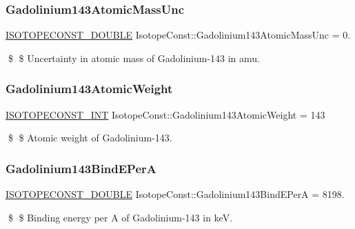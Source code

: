 \subsubsection{\texorpdfstring{Gadolinium143\+Atomic\+Mass\+Unc}{Gadolinium143AtomicMassUnc}}
{\footnotesize\ttfamily \mbox{\hyperlink{group___isotope_const-_macros_ga8f45a7272ce02c0b4c65c44636ed719a}{I\+S\+O\+T\+O\+P\+E\+C\+O\+N\+S\+T\+\_\+\+D\+O\+U\+B\+LE}} Isotope\+Const\+::\+Gadolinium143\+Atomic\+Mass\+Unc = 0.}

\$ \$ Uncertainty in atomic mass of Gadolinium-\/143 in amu. \mbox{\label{group___isotope_const-_gadolinium-_gd143_gad63211f510541410c4db00f5c26230f6}} 
\subsubsection{\texorpdfstring{Gadolinium143\+Atomic\+Weight}{Gadolinium143AtomicWeight}}
{\footnotesize\ttfamily \mbox{\hyperlink{group___isotope_const-_macros_ga5f18360b3e99483a35c32d789e62621c}{I\+S\+O\+T\+O\+P\+E\+C\+O\+N\+S\+T\+\_\+\+I\+NT}} Isotope\+Const\+::\+Gadolinium143\+Atomic\+Weight = 143}

\$ \$ Atomic weight of Gadolinium-\/143. \mbox{\label{group___isotope_const-_gadolinium-_gd143_gac97b4401d8732b680e461cb5e7a365ea}} 
\subsubsection{\texorpdfstring{Gadolinium143\+Bind\+E\+PerA}{Gadolinium143BindEPerA}}
{\footnotesize\ttfamily \mbox{\hyperlink{group___isotope_const-_macros_ga8f45a7272ce02c0b4c65c44636ed719a}{I\+S\+O\+T\+O\+P\+E\+C\+O\+N\+S\+T\+\_\+\+D\+O\+U\+B\+LE}} Isotope\+Const\+::\+Gadolinium143\+Bind\+E\+PerA = 8198.}

\$ \$ Binding energy per A of Gadolinium-\/143 in keV. \mbox{\label{group___isotope_const-_gadolinium-_gd143_ga627a7bc832205c9c8adc15ce12e1e981}} 
